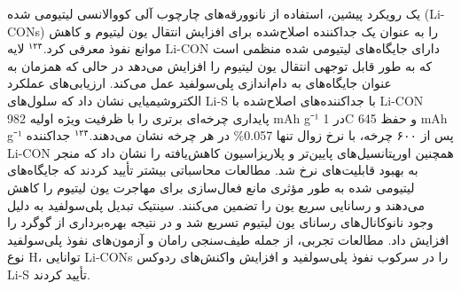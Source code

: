 \documentclass[12pt,a4paper,twocolumn]{article} %
\newcommand{\persian}[1]{\textfarsi{#1}}
\newcommand{\english}[1]{\textenglish{#1}}
\begin{document}
\persian{
یک رویکرد پیشین، استفاده از نانوورقه‌های چارچوب آلی کووالانسی لیتیومی شده (\english{Li-CONs}) را به عنوان یک جداکننده اصلاح‌شده برای افزایش انتقال یون لیتیوم و کاهش موانع نفوذ معرفی کرد.$^{۱۲۴}$ لایه \english{Li-CON} دارای جایگاه‌های لیتیومی شده منظمی است که به طور قابل توجهی انتقال یون لیتیوم را افزایش می‌دهد در حالی که همزمان به عنوان جایگاه‌های به دام‌اندازی پلی‌سولفید عمل می‌کند. ارزیابی‌های عملکرد الکتروشیمیایی نشان داد که سلول‌های \english{Li-S} با جداکننده‌های اصلاح‌شده با \english{Li-CON} پایداری چرخه‌ای برتری را با ظرفیت ویژه اولیه \english{982 mAh g⁻¹} در \english{1C} و حفظ \english{645 mAh g⁻¹} پس از ۶۰۰ چرخه، با نرخ زوال تنها \english{0.057\%} در هر چرخه نشان می‌دهند.$^{۱۲۴}$ جداکننده \english{Li-CON} همچنین اورپتانسیل‌های پایین‌تر و پلاریزاسیون کاهش‌یافته را نشان داد که منجر به بهبود قابلیت‌های نرخ شد. مطالعات محاسباتی بیشتر تأیید کردند که جایگاه‌های لیتیومی شده به طور مؤثری مانع فعال‌سازی برای مهاجرت یون لیتیوم را کاهش می‌دهند و رسانایی سریع یون را تضمین می‌کنند. سینتیک تبدیل پلی‌سولفید به دلیل وجود نانوکانال‌های رسانای یون لیتیوم تسریع شد و در نتیجه بهره‌برداری از گوگرد را افزایش داد. مطالعات تجربی، از جمله طیف‌سنجی رامان و آزمون‌های نفوذ پلی‌سولفید نوع \english{H}، توانایی \english{Li-CONs} را در سرکوب نفوذ پلی‌سولفید و افزایش واکنش‌های ردوکس \english{Li-S} تأیید کردند.
}
\end{document}
